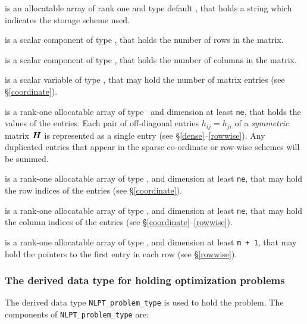 \documentclass{galahad}
\newcommand{\packagename}{NLPT}
\begin{document}
\begin{description}

 is an allocatable array of rank one and type default \character, 
that holds a string which indicates the storage scheme used.

 is a scalar component of type \integer,
that holds the number of rows in the matrix.

 is a scalar component of type \integer,
that holds the number of columns in the matrix.

 is a scalar variable of type \integer, that may
hold the number of matrix entries (see \S\ref{coordinate}).

 is a rank-one allocatable array of type \realdp\,
and dimension at least {\tt ne}, that holds the values of the entries.
Each pair of off-diagonal entries $h_{ij} = h_{ji}$ of a {\em symmetric}
matrix ${\bm{H}}$ is represented as a single entry
(see \S\ref{dense}--\ref{rowwise}).
Any duplicated entries that appear in the sparse
co-ordinate or row-wise schemes will be summed.

 is a rank-one allocatable array of type \integer,
and dimension at least {\tt ne}, that may hold the row indices of the entries
(see \S\ref{coordinate}).

 is a rank-one allocatable array of type \integer,
and dimension at least {\tt ne}, that may hold the column indices of the entries
(see \S\ref{coordinate}--\ref{rowwise}).

 is a rank-one allocatable array of type \integer,
and dimension at least {\tt m + 1}, that may hold the pointers to
the first entry in each row (see \S\ref{rowwise}).

\end{description}


\subsubsection{The derived data type for holding optimization problems}
\label{typeprob}

The derived data type
{\tt \packagename\_problem\_type}
is used to hold the problem.
The components of
{\tt \packagename\_problem\_type}
are:
\end{document}
